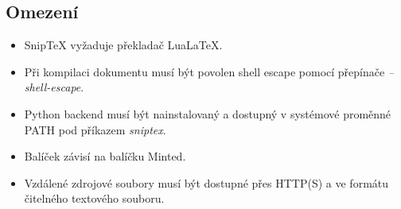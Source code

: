 \documentclass{article}
\begin{document}
\subsection*{Omezení}

\begin{itemize}
    \item Snip\TeX{} vyžaduje překladač LuaLaTeX.
    
    \item Při kompilaci dokumentu musí být povolen shell escape
    pomocí přepínače \textit{--shell-escape}.

    \item Python backend musí být nainstalovaný a dostupný v systémové proměnné PATH
    pod příkazem \textit{sniptex}.

    \item Balíček závisí na balíčku Minted.

    \item Vzdálené zdrojové soubory musí být dostupné přes HTTP(S)
    a ve formátu čitelného textového souboru.
\end{itemize}



\end{document}
